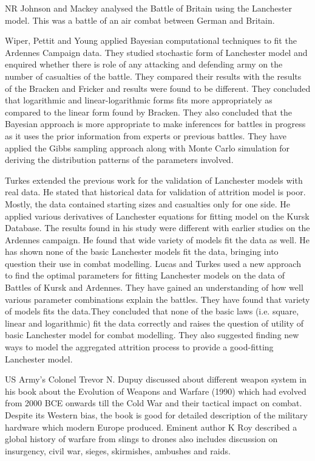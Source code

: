 \documentclass[]{article}
\begin{document}
NR Johnson and Mackey \autocite{JohsonMackey:2011}analysed the Battle of Britain using the Lanchester model. This was a battle of an air combat between German and Britain.

Wiper, Pettit and Young \autocite{WiperPetit:2000} applied Bayesian computational techniques to fit the Ardennes Campaign data. They studied stochastic form of Lanchester model and enquired whether there is role of any attacking and defending army on the number of casualties of the battle. They compared their results with the results of the Bracken and Fricker and results were found to be different. They concluded that logarithmic and linear-logarithmic forms fits more appropriately as compared to the linear form found by Bracken. They also concluded that the Bayesian approach is more appropriate to make inferences for battles in progress as it uses the prior information from experts or previous battles. They have applied the Gibbs sampling approach along with Monte Carlo simulation for deriving the distribution patterns of the parameters involved. 

Turkes \autocite{Turkes:2000} extended the previous work for the validation of Lanchester models with real data. He stated that historical data for validation of attrition model is poor. Mostly, the data contained starting sizes and casualties only for one side. He applied various derivatives of Lanchester equations for fitting model on the Kursk Database. The results found in his study were different with earlier studies on the Ardennes campaign. He found that wide variety of models fit the data as well. He has shown none of the basic Lanchester models fit the data, bringing into question their use in combat modelling. 
Lucas and Turkes \autocite{LukasTurkes:2004} used a new approach to find the optimal parameters for fitting Lanchester models on the data of Battles of Kursk and Ardennes. They have gained an understanding of how well various parameter combinations explain the battles. They have found that variety of models fits the data.They concluded that none of the basic laws (i.e. square, linear and logarithmic) fit the data correctly and raises the question of utility of basic Lanchester model for combat modelling. They also suggested finding new ways to model the aggregated attrition process to provide a good-fitting Lanchester model.

US Army’s Colonel Trevor N. Dupuy \autocite{dupuy1990evolution} discussed about different weapon system in his book about the Evolution of Weapons and Warfare (1990) which had evolved from 2000 BCE onwards till the Cold War and their tactical impact on combat. Despite its Western bias, the book is good for detailed description of the military hardware which modern Europe produced. Eminent author K Roy \autocite{Roy2022} described a global history of warfare from slings to drones also includes discussion on insurgency, civil war, sieges, skirmishes, ambushes and raids.
\end{document}
